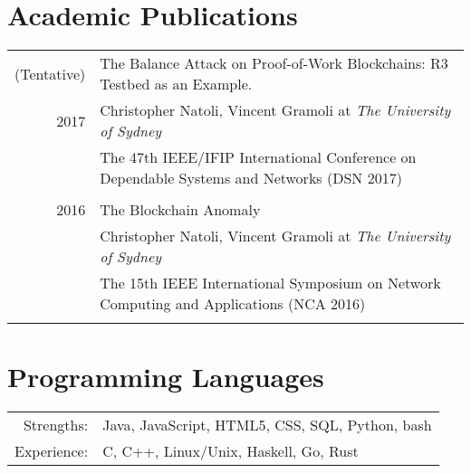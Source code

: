 \documentclass[10pt]{article}
\begin{document}
%
\section{Academic Publications}
\begin{tabular}{r p{11cm}}
(Tentative) & The Balance Attack on Proof-of-Work Blockchains: R3 Testbed as an Example.\\ 2017 & Christopher Natoli, Vincent Gramoli at \emph{The University of Sydney} \\ & \footnotesize{The 47th IEEE/IFIP International Conference on Dependable Systems and Networks (DSN 2017)}\\\multicolumn{2}{c}{}\\
2016 & The Blockchain Anomaly\\ & Christopher Natoli, Vincent Gramoli at \emph{The University of Sydney} \\ & \footnotesize{The 15th IEEE International Symposium on Network Computing and Applications (NCA 2016)}\\\multicolumn{2}{c}{}\\
\end{tabular}

\section{Programming Languages}
\begin{tabular}{rl}
Strengths: & Java, JavaScript, HTML5, CSS, SQL, Python, bash\\
Experience: & C, C++, Linux/Unix, Haskell, Go, Rust
\end{tabular}
\end{document}
